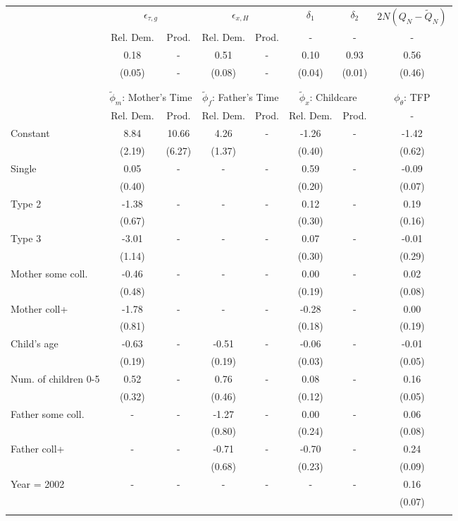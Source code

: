 \begin{tabular}{lccccccc}\toprule
 & \multicolumn{2}{c}{$\epsilon_{\tau,g}$} & \multicolumn{2}{c}{$\epsilon_{x,H}$} & {$\delta_{1}$} & {$\delta_{2}$} & $2N(Q_{N} - \tilde{Q}_{N})$ \\
 & Rel. Dem. & Prod. & Rel. Dem. & Prod. & - & - & - \\\cmidrule(r){2-3}\cmidrule(r){4-5}\cmidrule(r){6-6}\cmidrule(r){7-7}\cmidrule(r){8-8}
&0.18& - &0.51& - &0.10&0.93&0.56\\
&(0.05)& - &(0.08)& - &(0.04)&(0.01)&(0.46)\\
\\
&&&&&&&\\
 & \multicolumn{2}{c}{$\tilde{\phi}_{m}$: Mother's Time} & \multicolumn{2}{c}{$\tilde{\phi}_{f}$: Father's Time} & \multicolumn{2}{c}{$\tilde{\phi}_{x}$: Childcare} &{$\phi_{\theta}$: TFP} \\
 & Rel. Dem. & Prod. & Rel. Dem. & Prod. & Rel. Dem. & Prod. & -  \\\cmidrule(r){2-3}\cmidrule(r){4-5}\cmidrule(r){6-7}\cmidrule(r){8-8}
Constant&8.84&10.66&4.26& -&-1.26& -&-1.42\\
&(2.19)&(6.27)&(1.37)&&(0.40)&&(0.62)\\
Single&0.05& -& - & -&0.59& -&-0.09\\
&(0.40)& & &&(0.20)&&(0.07)\\
Type 2&-1.38& -& - & -&0.12& -&0.19\\
&(0.67)& & &&(0.30)&&(0.16)\\
Type 3&-3.01& -& - & -&0.07& -&-0.01\\
&(1.14)& & &&(0.30)&&(0.29)\\
Mother some coll.&-0.46& -& - & -&0.00& -&0.02\\
&(0.48)& & &&(0.19)&&(0.08)\\
Mother coll+&-1.78& -& - & -&-0.28& -&0.00\\
&(0.81)& & &&(0.18)&&(0.19)\\
Child's age&-0.63& -&-0.51& -&-0.06& -&-0.01\\
&(0.19)&&(0.19)&&(0.03)&&(0.05)\\
Num. of children 0-5&0.52& -&0.76& -&0.08& -&0.16\\
&(0.32)&&(0.46)&&(0.12)&&(0.05)\\
Father some coll.& - & -&-1.27& -&0.00& -&0.06\\
 & &&(0.80)&&(0.24)&&(0.08)\\
Father coll+& - & -&-0.71& -&-0.70& -&0.24\\
 & &&(0.68)&&(0.23)&&(0.09)\\
Year = 2002& - & -& - & -& - & -&0.16\\
 & & & & & &&(0.07)\\
\\
\bottomrule\end{tabular}
